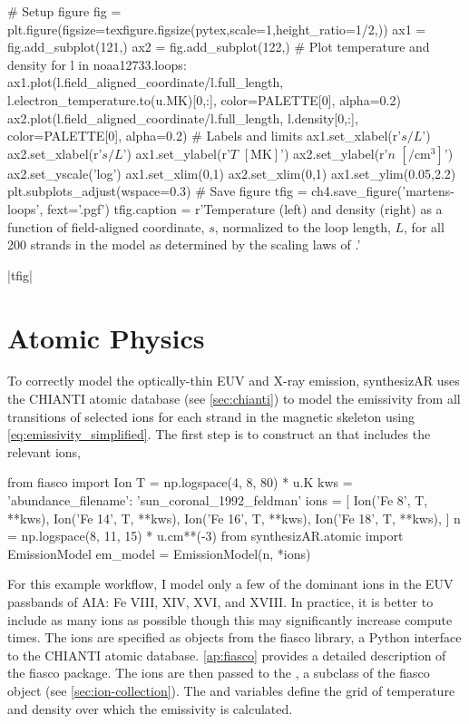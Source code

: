 \begin{pycode}[chapter4]
# Setup figure
fig = plt.figure(figsize=texfigure.figsize(pytex,scale=1,height_ratio=1/2,))
ax1 = fig.add_subplot(121,)
ax2 = fig.add_subplot(122,)
# Plot temperature and density
for l in noaa12733.loops:
    ax1.plot(l.field_aligned_coordinate/l.full_length,
             l.electron_temperature.to(u.MK)[0,:],
             color=PALETTE[0], alpha=0.2)
    ax2.plot(l.field_aligned_coordinate/l.full_length,
             l.density[0,:],
             color=PALETTE[0], alpha=0.2)
# Labels and limits
ax1.set_xlabel(r'$s/L$')
ax2.set_xlabel(r'$s/L$')
ax1.set_ylabel(r'$T$ $[\si{\mega\kelvin}]$')
ax2.set_ylabel(r'$n$ $[\si{\per\cubic\cm}]$')
ax2.set_yscale('log')
ax1.set_xlim(0,1)
ax2.set_xlim(0,1)
ax1.set_ylim(0.05,2.2)
plt.subplots_adjust(wspace=0.3)
# Save figure
tfig = ch4.save_figure('martens-loops', fext='.pgf')
tfig.caption = r'Temperature (left) and density (right) as a function of field-aligned coordinate, $s$, normalized to the loop length, $L$, for all 200 strands in the model \AR{} as determined by the scaling laws of \citet{martens_scaling_2010}.'
\end{pycode}
\py[chapter4]|tfig|

\section{Atomic Physics}\label{sec:atomic-physics}

To correctly model the optically-thin EUV and X-ray emission, synthesizAR uses the CHIANTI atomic database (see \autoref{sec:chianti}) to model the emissivity from all transitions of selected ions for each strand in the magnetic skeleton using \autoref{eq:emissivity_simplified}. The first step is to construct an  that includes the relevant ions,
\begin{pyblock}[chapter4][baselinestretch=1,xleftmargin=3em]
from fiasco import Ion
T = np.logspace(4, 8, 80) * u.K
kws = { 'abundance_filename': 'sun_coronal_1992_feldman' }
ions = [
    Ion('Fe 8', T, **kws),
    Ion('Fe 14', T, **kws),
    Ion('Fe 16', T, **kws),
    Ion('Fe 18', T, **kws),
]
n = np.logspace(8, 11, 15) * u.cm**(-3)
from synthesizAR.atomic import EmissionModel
em_model = EmissionModel(n, *ions)
\end{pyblock}
For this example workflow, I model only a few of the dominant ions in the EUV passbands of AIA: Fe VIII, XIV, XVI, and XVIII. In practice, it is better to include as many ions as possible though this may significantly increase compute times. The ions are specified as  objects from the fiasco library, a Python interface to the CHIANTI atomic database. \autoref{ap:fiasco} provides a detailed description of the fiasco package. The ions are then passed to the , a subclass of the fiasco  object (see \autoref{sec:ion-collection}). The  and  variables define the grid of temperature and density over which the emissivity is calculated.

